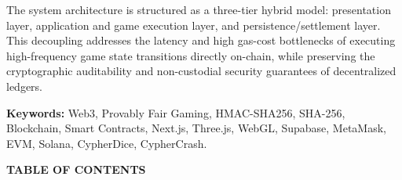 The system architecture is structured as a three-tier hybrid model: presentation layer, application and game execution layer, and persistence/settlement layer. This decoupling addresses the latency and high gas-cost bottlenecks of executing high-frequency game state transitions directly on-chain, while preserving the cryptographic auditability and non-custodial security guarantees of decentralized ledgers.

\vspace{0.8cm}
\noindent\textbf{Keywords:} Web3, Provably Fair Gaming, HMAC-SHA256, SHA-256, Blockchain, Smart Contracts, Next.js, Three.js, WebGL, Supabase, MetaMask, EVM, Solana, CypherDice, CypherCrash.

\newpage
\pagestyle{frontmatterstyle}
\thispagestyle{frontmatterstyle}
\begin{center}
    \vspace*{0.5cm}
    {\Large \textbf{TABLE OF CONTENTS}\par}
    \vspace{0.8cm}
\end{center}


